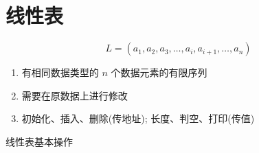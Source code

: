 \chapter{线性表}

\begin{definition}[线性表]
    $$L=(a_{1},a_{2},a_{3},\dots,a_{i},a_{i+1},\dots,a_{n})$$
    \begin{enumerate}
        \item 有相同数据类型的 $n$ 个数据元素的有限序列
        \item 需要在原数据上进行修改
        \item 初始化、插入、删除(传地址); 长度、判空、打印(传值)
    \end{enumerate}
\end{definition}
线性表基本操作
